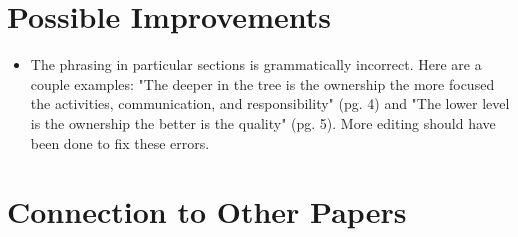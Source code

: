 \documentclass[english]{article}
\begin{document}
\section*{Possible Improvements}
\begin{itemize}
\item The phrasing in particular sections is grammatically incorrect. Here are a couple examples: "The deeper in the tree is the ownership the more focused the activities, communication, and responsibility" (pg. 4) and "The lower level is the ownership the better is the quality" (pg. 5). More editing should have been done to fix these errors.
\end{itemize}

\section*{Connection to Other Papers}




\end{document}
